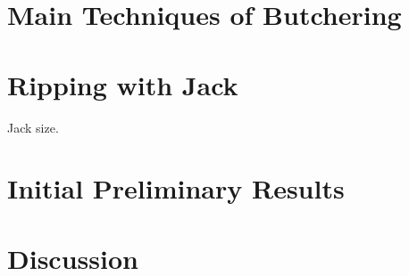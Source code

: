 \documentclass[preprint,10pt,nonatbib]{sigplanconf}
\begin{document}
\section{Main Techniques of Butchering}
\label{section:techniques}


\section{Ripping with Jack}
\label{section:jack}

Jack size.

% 

\section{Initial Preliminary Results}
\label{section:initial}


\section{Discussion}
\label{section:zz}

\balance
\small

\end{document}
